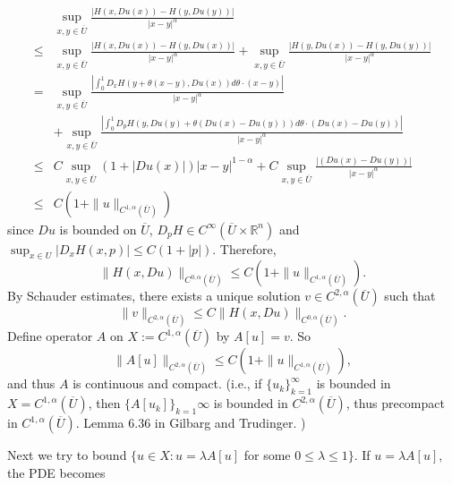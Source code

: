 \documentclass[11pt,reqno]{amsart}
\numberwithin{figure}{section}
\theoremstyle{plain}
\theoremstyle{remark}
\numberwithin{equation}{section}
\begin{document}
\begin{appendices}
\begin{equation}
    \begin{aligned}
  &\sup_{x, y \in \overline{U}}\frac{|H(x, Du(x))-H(y, Du(y))|}{|x-y|^\alpha}\\
  \leq &  \sup_{x, y \in \overline{U}}\frac{|H(x, Du(x))-H(y, Du(x))|}{|x-y|^\alpha} + \sup_{x, y \in \overline{U}}\frac{|H(y, Du(x))-H(y, Du(y))|}{|x-y|^\alpha} \\
  =&    \sup_{x, y \in \overline{U}}\frac{|\int_0^1D_xH(y+\theta (x-y), Du(x))d\theta \cdot (x-y)|}{|x-y|^\alpha}\\& +
     \sup_{x, y \in \overline{U}}\frac{|\int_0^1D_pH(y, Du(y)+\theta (Du(x)-Du(y)))d\theta \cdot (Du(x)-Du(y))|}{|x-y|^\alpha}\\
  \leq &  C\sup_{x, y \in \overline{U}} (1+|Du(x)|)|x-y|^{1-\alpha} +  C \sup_{x, y \in \overline{U}}\frac{| (Du(x)-Du(y))|}{|x-y|^\alpha}\\
 \leq & C(1 + \|u\|_{C^{1,\alpha}(\overline{U})})
    \end{aligned}
\end{equation}
since $Du$ is bounded on $\overline{U}$, $D_pH \in C^\infty (\overline{U} \times \mathbb{R}^n)$ and
$\displaystyle \sup_{x\in U}|D_xH(x,p)|\leq C(1+|p|)$. Therefore,
\begin{equation}
 \|H(x, Du)\|_{C^{0, \alpha}(\overline{U})} \leq C(1 + \|u\|_{C^{1,\alpha}(\overline{U})}).
\end{equation}
By Schauder estimates, there exists a unique solution $v \in C^{2,\alpha }(\overline{U})$ such that
\begin{equation}
\label{schauder}
    \|v\|_{C^{2, \alpha}(\overline{U})} \leq C  \|H(x, Du)\|_{C^{0, \alpha}(\overline{U})}. 
\end{equation}
\noindent Define operator $A$ on $X := C^{1, \alpha} (\overline{U}) $ by $A[u]=v$. So 
\begin{equation}
     \|A[u]\|_{C^{2, \alpha}(\overline{U})} \leq C(1 + \|u\|_{C^{1,\alpha}(\overline{U})}),
\end{equation}
\noindent
 and thus $A$ is continuous and compact. (i.e., if $\{u_k\}_{k=1}^\infty$ is bounded in $X=C^{1, \alpha}(\overline{U})$, then $\{A[u_k]\}_{k=1}\infty$ is bounded in $C^{2,\alpha} (\overline{U})$, thus precompact in $C^{1, \alpha}(\overline{U})$. Lemma 6.36 in Gilbarg and Trudinger. )
 
 Next we try to bound $\{u\in X : u=\lambda A[u]$ for some $0 \leq  \lambda \leq 1\}$.
 If $u=\lambda A[u]$, the PDE becomes
 

\end{appendices}
\end{document}
